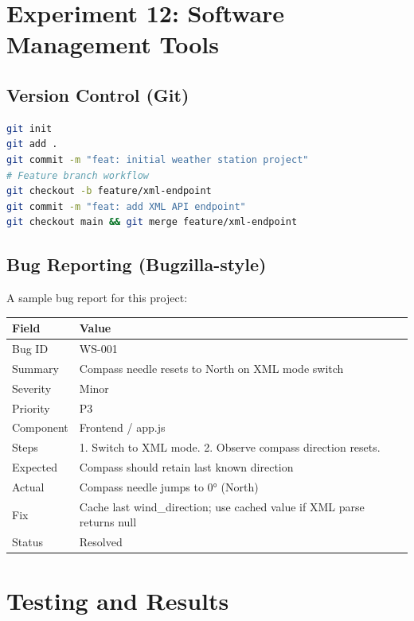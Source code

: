 \documentclass[12pt,a4paper]{article}
\begin{document}
\section{Experiment 12: Software Management Tools}

\subsection{Version Control (Git)}
\begin{lstlisting}[language=bash, caption=Git workflow]
git init
git add .
git commit -m "feat: initial weather station project"
# Feature branch workflow
git checkout -b feature/xml-endpoint
git commit -m "feat: add XML API endpoint"
git checkout main && git merge feature/xml-endpoint
\end{lstlisting}

\subsection{Bug Reporting (Bugzilla-style)}
A sample bug report for this project:

\begin{center}
\begin{tabularx}{\textwidth}{lX}
\toprule
\textbf{Field} & \textbf{Value} \\
\midrule
Bug ID     & WS-001 \\
Summary    & Compass needle resets to North on XML mode switch \\
Severity   & Minor \\
Priority   & P3 \\
Component  & Frontend / app.js \\
Steps      & 1. Switch to XML mode. 2. Observe compass direction resets. \\
Expected   & Compass should retain last known direction \\
Actual     & Compass needle jumps to 0° (North) \\
Fix        & Cache last wind\_direction; use cached value if XML parse returns null \\
Status     & Resolved \\
\bottomrule
\end{tabularx}
\end{center}

\section{Testing and Results}
\end{document}
